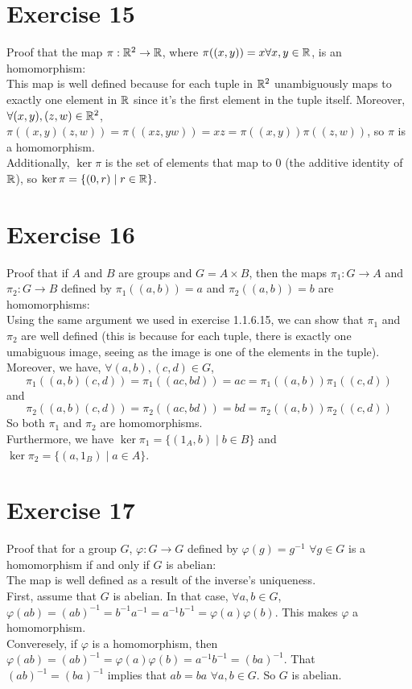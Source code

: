 \documentclass[12pt]{article}
\begin{document}
    \section*{Exercise 15}
    Proof that the map $\pi: \mathbb{R}^2 \to \mathbb{R}$,
    where $\pi((x, y)) = x \forall x, y \in \mathbb{R}$, is an homomorphism: \\
    This map is well defined because for each tuple in $\mathbb{R}^2$
    unambiguously maps to exactly one element in $\mathbb{R}$
    since it's the first element in the tuple itself.
    Moreover, $\forall (x, y), (z, w) \in \mathbb{R}^2$,
    $\pi((x, y)(z, w)) = \pi((xz, yw)) = xz = \pi((x, y))\pi((z, w))$,
    so $\pi$ is a homomorphism. \\
    Additionally, $\ker \pi$ is the set of elements that map to $0$
    (the additive identity of $\mathbb{R}$),
    so $\ker \pi = \{(0, r) \mid r \in \mathbb{R}\}$.                                                       


    \section*{Exercise 16}
    Proof that if $A$ and $B$ are groups and $G = A \times B$,
    then the maps $\pi_1: G \to A$ and $\pi_2: G \to B$ defined by
    $\pi_1((a, b)) = a$ and $\pi_2((a, b)) = b$ are homomorphisms: \\
    Using the same argument we used in exercise 1.1.6.15,
    we can show that $\pi_1$ and $\pi_2$ are well defined
    (this is because for each tuple, there is exactly one umabiguous image,
    seeing as the image is one of the elements in the tuple).\\
    Moreover, we have, $\forall (a, b), (c, d) \in G$,
    \[ \pi_1((a, b)(c, d)) = \pi_1((ac, bd))
    = ac
    = \pi_1((a, b))\pi_1((c, d)) \]
    and
    \[ \pi_2((a, b)(c, d)) = \pi_2((ac, bd))
    = bd
    = \pi_2((a, b))\pi_2((c, d)) \]
    So both $\pi_1$ and $\pi_2$ are homomorphisms. \\
    Furthermore, we have $\ker \pi_1 = \{(1_A, b) \mid b \in B\}$
    and $\ker \pi_2 = \{(a, 1_B) \mid a \in A\}$.


    \section*{Exercise 17}
    Proof that for a group $G$, $\varphi: G \to G$
    defined by $\varphi(g) = g^{-1}$ $\forall g \in G$
    is a homomorphism if and only if $G$ is abelian: \\
    The map is well defined as a result of the inverse's uniqueness. \\
    First, assume that $G$ is abelian.
    In that case, $\forall a, b \in G$,
    $\varphi(ab) = (ab)^{-1} = b^{-1}a^{-1} 
    = a^{-1}b^{-1}
    = \varphi(a)\varphi(b)$.
    This makes $\varphi$ a homomorphism. \\
    Converesely, if $\varphi$ is a homomorphism,
    then $\varphi(ab) = (ab)^{-1}
    = \varphi(a)\varphi(b)
    = a^{-1}b^{-1} 
    = (ba)^{-1}$.
    That $(ab)^{-1} = (ba)^{-1}$ implies that $ab = ba$ $\forall a, b \in G$.
    So $G$ is abelian.
\end{document}
